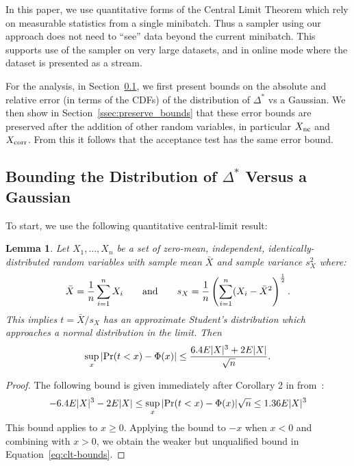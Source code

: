 \documentclass{article}
\newtheorem{lemma}{Lemma}
\begin{document}
In this paper, we use quantitative forms of the Central Limit Theorem which rely
on measurable statistics from a single minibatch. Thus a sampler using our
approach does not need to ``see'' data beyond the current minibatch. This
supports use of the sampler on very large datasets, and in online mode where the
dataset is presented as a stream.

For the analysis, in Section~\ref{ssec:delta_star_distribution}, we first
present bounds on the absolute and relative error (in terms of the CDFs) of the
distribution of $\Delta^*$ vs a Gaussian. We then show in
Section~\ref{ssec:preserve_bounds} that these error bounds are preserved after
the addition of other random variables, in particular $X_{\rm nc}$ and $X_{\rm
corr}$. From this it follows that the acceptance test has the same error bound.

\subsection{Bounding the Distribution of $\Delta^*$ Versus a Gaussian}\label{ssec:delta_star_distribution}

To start, we use the following quantitative central-limit result:
  
\begin{lemma}\label{lem:quant_clt}
Let $X_1,\ldots,X_n$ be a set of zero-mean, independent, identically-distributed
random variables with sample mean $\bar{X}$ and sample variance $s^2_X$
where:
\begin{equation}
    \bar{X} = \frac{1}{n}\sum_{i=1}^nX_i \qquad {\rm and} \qquad s_X = \frac{1}{n}\left(\sum_{i=1}^n(X_i-\bar{X}^2\right)^{\frac{1}{2}}.
\end{equation}
This implies $t=\bar{X}/s_X$ has an approximate Student's distribution
which approaches a normal distribution in the limit. Then
\begin{equation}\label{eq:clt-bounds}
    \sup_x|{\rm Pr}(t<x) - \Phi(x)| \leq \frac{6.4E|X|^3+2E|X|}{\sqrt{n}}.
\end{equation}
\end{lemma}

\begin{proof}
The following bound is given immediately after Corollary 2 in from~\cite{explicit-clt05}:
\begin{equation}\label{eq:clt-boundsx}
-6.4E|X|^3-2E|X| \leq    \sup_x|{\rm Pr}(t<x) - \Phi(x)|{\sqrt{n}} \leq 1.36E|X|^3
\end{equation}
This bound applies to $x\geq 0$. Applying the bound to $-x$ when $x<0$
and combining with $x>0$, we obtain the weaker but unqualified bound
in Equation~\ref{eq:clt-bounds}.
\end{proof}
\end{document}
